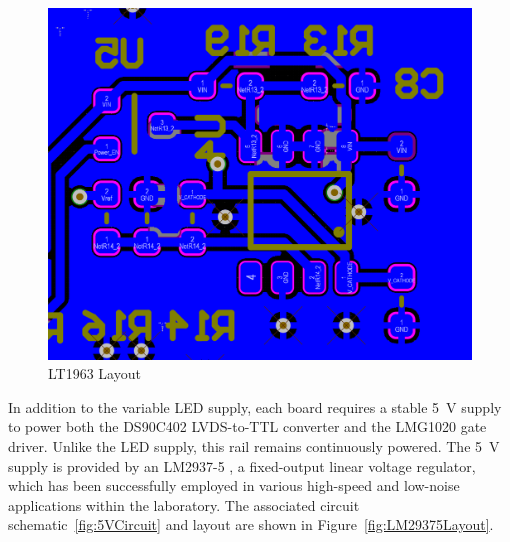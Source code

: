\documentclass[a4paper,11pt]{article}
\begin{document}
\begin{figure}[htbp]
\centering
\includegraphics[scale=0.5]{LT1963layout.png}
\caption{LT1963 Layout\label{fig:LT1963Layout}}
\end{figure}

In addition to the variable LED supply, each board requires a stable 5~V supply to power both the DS90C402 LVDS-to-TTL converter and the LMG1020 gate driver. Unlike the LED supply, this rail remains continuously powered. The 5~V supply is provided by an LM2937-5 \cite{LM2347-5}, a fixed-output linear voltage regulator, which has been successfully employed in various high-speed and low-noise applications within the laboratory. The associated circuit schematic~\ref{fig:5VCircuit} and layout are shown in Figure~\ref{fig:LM29375Layout}.
\end{document}
